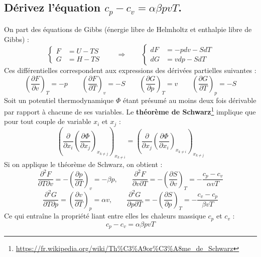 \subsection{Dérivez l'équation $c_p-c_v = \alpha\beta pvT$.\label{q:1_7}}
On part des équations de Gibbs (énergie libre de Helmholtz et enthalpie libre de Gibbs) :
\begin{equation} \begin{cases} F &= U-TS \\ G &= H-TS \end{cases} \qquad \Rightarrow \qquad \begin{cases} dF &= -pdv - SdT \\ dG &= vdp - SdT \end{cases} \end{equation}
Ces différentielles correspondent aux expressions des dérivées partielles suivantes :
\begin{equation} \left(\frac{\partial F}{\partial v}\right)_T = -p \qquad \left(\frac{\partial F}{\partial T}\right)_v = -S \qquad \left(\frac{\partial G}{\partial p}\right)_T = v \qquad \left(\frac{\partial G}{\partial T}\right)_p = -S \end{equation}
Soit un potentiel thermodynamique $\Phi$ étant présumé au moins deux fois dérivable par rapport à chacune de ses variables. Le \textbf{théorème de Schwarz}\footnote{\url{https://fr.wikipedia.org/wiki/Th\%C3\%A9or\%C3\%A8me_de_Schwarz}} implique que pour tout couple de variable $x_i$ et $x_j$ :
\begin{equation} \left(\frac{\partial}{\partial x_i}\left(\frac{\partial \Phi}{\partial x_j}\right)_{x_{k\neq j}}\right)_{x_{k\neq i}} = \left(\frac{\partial}{\partial x_j}\left(\frac{\partial \Phi}{\partial x_i}\right)_{x_{k\neq i}}\right)_{x_{k\neq j}} \end{equation}
Si on applique le théorème de Schwarz, on obtient :
\begin{equation} \frac{\partial^2F}{\partial T\partial v} = -\left(\frac{\partial p}{\partial T}\right)_v = -\beta p , \qquad \frac{\partial^2F}{\partial v\partial T} = -\left(\frac{\partial S}{\partial v}\right)_T = -\frac{c_p-c_v}{\alpha vT} \end{equation}
\begin{equation} \frac{\partial^2G}{\partial T\partial p} = \left(\frac{\partial v}{\partial T}\right)_p = \alpha v , \qquad \frac{\partial^2G}{\partial p\partial T} = -\left(\frac{\partial S}{\partial p}\right)_T = -\frac{c_v-c_p}{\beta vT} \end{equation}
Ce qui entraîne la propriété liant entre elles les chaleurs massique $c_p$ et $c_v$ :
\begin{equation} c_p-c_v = \alpha\beta pvT \label{eq:relation_chaleur}\end{equation}

